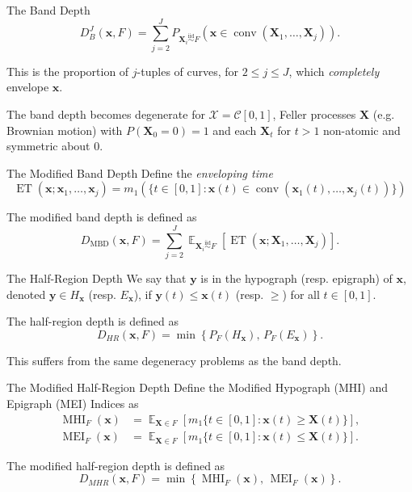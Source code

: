 \documentclass[handout, notes]{beamer}
\newcommand{\vx}{\bm{x}}
\newcommand{\vy}{\bm{y}}
\newcommand{\vX}{\bm{X}}
\newcommand{\iid}{\overset{\text{iid}}{\sim}}
\DeclareMathOperator{\E}{\mathbb{E}}
\DeclareMathOperator{\conv}{conv}
\DeclareMathOperator{\ET}{ET}
\DeclareMathOperator{\MHI}{MHI}
\DeclareMathOperator{\MEI}{MEI}
\DeclareMathOperator{\MBD}{MBD}
\begin{document}


    \begin{frame}{The Band Depth}
        \[
            D_B^J(\vx, F) = \sum_{j = 2}^J P_{\vX_i \iid F}(\vx \in \conv(\vX_1, \dots, \vX_j)).
        \]

        This is the proportion of $j$-tuples of curves, for $2 \leq j \leq J$,
        which \emph{completely} envelope $\vx$.

        The band depth becomes degenerate for $\mathscr{X} = \mathcal{C}[0,
        1]$, Feller processes $\vX$ (e.g. Brownian motion) with $P(\vX_0 = 0)
        = 1$ and each $\vX_t$ for $t > 1$ non-atomic and symmetric about $0$.
    \end{frame}

    \begin{frame}{The Modified Band Depth}
        Define the \emph{enveloping time} \[
            \ET(\vx; \vx_1, \dots, \vx_j) = m_1(\{t \in [0, 1]\colon \vx(t) \in \conv(\vx_1(t), \dots, \vx_j(t))\})
        \]

        The modified band depth is defined as \[
            D_{\MBD}(\vx, F) = \sum_{j = 2}^J \E_{\vX_i \iid F}\left[\ET(\vx; \vX_1, \dots, \vX_j)\right].
        \]
    \end{frame}

    \begin{frame}{The Half-Region Depth}
        We say that $\vy$ is in the hypograph (resp. epigraph) of $\vx$,
        denoted $\vy \in H_{\vx}$ (resp. $E_{\vx}$), if $\vy(t) \leq \vx(t)$
        (resp. $\geq$) for all $t \in [0, 1]$.

        The half-region depth is defined as \[
            D_{HR}(\vx, F) = \min\left\{P_F(H_{\vx}),\, P_F(E_{\vx})\right\}.
        \]

        This suffers from the same degeneracy problems as the band depth.
    \end{frame}

    \begin{frame}{The Modified Half-Region Depth}
        Define the Modified Hypograph (MHI) and Epigraph (MEI) Indices as
        \begin{align*}
            \MHI_F(\vx) &= \E_{\vX \in F}[m_1\{t \in [0, 1]\colon \vx(t) \geq \vX(t)\}], \\
            \MEI_F(\vx) &= \E_{\vX \in F}[m_1\{t \in [0, 1]\colon \vx(t) \leq \vX(t)\}].
        \end{align*}

        The modified half-region depth is defined as \[
            D_{MHR}(\vx, F) = \min\left\{\MHI_F({\vx}),\, \MEI_F({\vx})\right\}.
        \]
    \end{frame}
\end{document}
